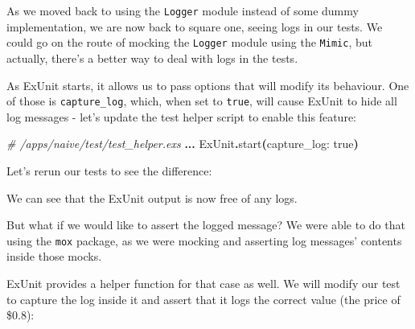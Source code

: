 \documentclass[
  oneside]{book}
\newenvironment{Shaded}{\begin{snugshade}}{\end{snugshade}}
\newcommand{\BuiltInTok}[1]{#1}
\newcommand{\CommentTok}[1]{\textcolor[rgb]{0.56,0.35,0.01}{\textit{#1}}}
\newcommand{\ConstantTok}[1]{\textcolor[rgb]{0.56,0.35,0.01}{#1}}
\newcommand{\ErrorTok}[1]{\textcolor[rgb]{0.64,0.00,0.00}{\textbf{#1}}}
\newcommand{\ExtensionTok}[1]{#1}
\newcommand{\FunctionTok}[1]{\textcolor[rgb]{0.13,0.29,0.53}{\textbf{#1}}}
\newcommand{\KeywordTok}[1]{\textcolor[rgb]{0.13,0.29,0.53}{\textbf{#1}}}
\newcommand{\NormalTok}[1]{#1}
\newcommand{\OperatorTok}[1]{\textcolor[rgb]{0.81,0.36,0.00}{\textbf{#1}}}
\newcommand{\VariableTok}[1]{\textcolor[rgb]{0.00,0.00,0.00}{#1}}
\begin{document}
As we moved back to using the \texttt{Logger} module instead of some dummy implementation, we are now back to square one, seeing logs in our tests. We could go on the route of mocking the \texttt{Logger} module using the \texttt{Mimic}, but actually, there's a better way to deal with logs in the tests.

As ExUnit starts, it allows us to pass options that will modify its behaviour. One of those is \texttt{capture\_log}, which, when set to \texttt{true}, will cause ExUnit to hide all log messages - let's update the test helper script to enable this feature:

\begin{Shaded}
\begin{Highlighting}[]
\CommentTok{\# /apps/naive/test/test\_helper.exs}
\OperatorTok{...}
\ConstantTok{ExUnit}\OperatorTok{.}\NormalTok{start}\FunctionTok{(}\VariableTok{capture\_log:} \ConstantTok{true}\FunctionTok{)}
\end{Highlighting}
\end{Shaded}

Let's rerun our tests to see the difference:

\begin{Shaded}
\end{Shaded}

We can see that the ExUnit output is now free of any logs.

But what if we would like to assert the logged message? We were able to do that using the \texttt{mox} package, as we were mocking and asserting log messages' contents inside those mocks.

ExUnit provides a helper function for that case as well. We will modify our test to capture the log inside it and assert that it logs the correct value (the price of \$0.8):
\end{document}
